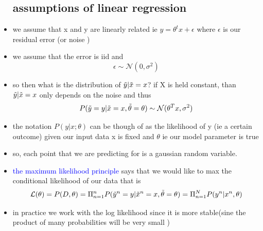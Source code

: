 \documentclass{article}
\begin{document}
\begin{itemize}
\subsection*{assumptions of linear regression}
\item we assume that x and y are linearly related ie $y=\theta^{t}x+\epsilon$ where $\epsilon$ is our residual error (or noise )
\item we assume that the error is iid and $$\epsilon\sim\mathcal{N}(0,\sigma^{2})$$  
\item so then what is the distribution of $\tilde{y}|\Tilde{x}=x$? if X is held constant, than $\Tilde{y}|\tilde{x}=x$ only depends on the noise and thus $$P(\Tilde{y}=y|\tilde{x}=x,\tilde{\theta}= \theta)\sim \mathcal{N}(\theta^{T}x, \sigma^{2})$$ 
\item the notation  $P(y|x;\theta)$ can be though of as the likelihood of y (ie a certain outcome) given our input data x is fixed and $\theta$ ie our model parameter is true 
\item so, each point that we are predicting for is a gaussian random variable. 
\item \textcolor{blue}{the maximum likelihood principle} says that we would like to max the conditional likelihood of our data  that is $$\mathcal{L}(\theta)=P(D, \theta)=\Pi_{n=1}^{n}P(\Tilde{y}^n=y|\Tilde{x}^n=x, \Tilde{\theta} =\theta )=\Pi_{n=1}^{N}P(y^n|x^n, \theta)$$
\item in practice we work with the log likelihood since it is more stable(sine the product of many probabilities will be very small ) 

\end{itemize}
\end{document}
